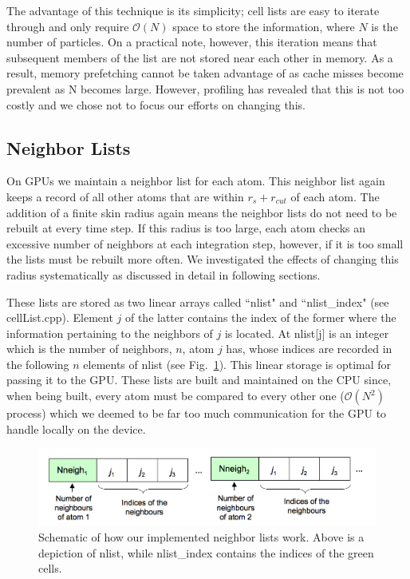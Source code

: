 \documentclass[12pt]{article}
\begin{document}
The advantage of this technique is its simplicity; cell lists are easy to iterate through and only require $\mathcal{O}(N)$ space to store the information, where $N$ is the number of particles.  On a practical note, however, this iteration means that subsequent members of the list are not stored near each other in memory.  As a result, memory prefetching cannot be taken advantage of as cache misses become prevalent as N becomes large.  However, profiling has revealed that this is not too costly and we chose not to focus our efforts on changing this.
\subsection{Neighbor Lists}
On GPUs we maintain a neighbor list for each atom.  This neighbor list again keeps a record of all other atoms that are within $r_s + r_{cut}$ of each atom.  The addition of a finite skin radius again means the neighbor lists do not need to be rebuilt at every time step. If this radius is too large, each atom checks an excessive number of neighbors at each integration step, however, if it is too small the lists must be rebuilt more often.  We investigated the effects of changing this radius systematically as discussed in detail in following sections.

These lists are stored as two linear arrays called ``nlist" and ``nlist\_index" (see cellList.cpp).  Element $j$ of the latter contains the index of the former where the information pertaining to the neighbors of $j$ is located.  At nlist[j] is an integer which is the number of neighbors, $n$, atom $j$ has, whose indices are recorded in the following $n$ elements of nlist (see Fig.~\ref{fig:nlist}).  This linear storage is optimal for passing it to the GPU.  These lists are built and maintained on the CPU since, when being built, every atom must be compared to every other one ($\mathcal{O}(N^2)$ process) which we deemed to be far too much communication for the GPU to handle locally on the device.

\begin{figure}[H]
   	\includegraphics[width=\textwidth]{nlist.png}
	\caption{Schematic of how our implemented neighbor lists work.  Above is a depiction of nlist, while nlist\_index contains the indices of the green cells.}
	\label{fig:nlist}
\end{figure}
\end{document}
